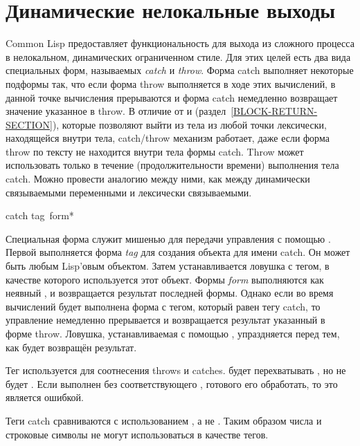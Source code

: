 \section{Динамические нелокальные выходы}
\label{CATCH-THROW-SECTION}

Common Lisp предоставляет функциональность для выхода из сложного процесса в
нелокальном, динамических ограниченном стиле. Для этих целей есть два вида
специальных форм, называемых \emph{catch} и \emph{throw}.
Форма catch выполняет некоторые подформы так, что если форма throw выполняется в
ходе этих вычислений, в данной точке вычисления прерываются и форма catch
немедленно возвращает значение указанное в throw. В отличие от  и
 (раздел~\ref{BLOCK-RETURN-SECTION}), которые позволяют выйти из
тела  из любой точки лексически, находящейся внутри тела, catch/throw
механизм работает, даже если форма throw по тексту не находится внутри тела
формы catch.
Throw может использовать только в течение (продолжительности времени) выполнения
тела catch. Можно провести аналогию между ними, как между динамически
связываемыми переменными и лексически связываемыми.

\begin{defspec}
catch tag {\,form}*

Специальная форма  служит мишенью для передачи управления с помощью
.
Первой выполняется форма \emph{tag} для создания объекта для имени catch.
Он может быть любым Lisp'овым объектом.
Затем устанавливается ловушка с тегом, в качестве которого используется этот
объект.
Формы \emph{form} выполняются как неявный ,
и возвращается результат последней формы.
Однако если во время вычислений будет выполнена форма  с тегом,
который равен  тегу catch, то управление немедленно прерывается и
возвращается результат указанный в форме throw.
Ловушка, устанавливаемая с помощью , упраздняется перед тем, как
будет возвращён результат.

Тег используется для соотнесения throws и catches.
 будет перехватывать ,
но не будет . Если  выполнен без
соответствующего , готового его обработать, то это является ошибкой.

Теги catch сравниваются с использованием , а не .
Таким образом числа и строковые символы не могут использоваться в качестве
тегов.
\end{defspec}

